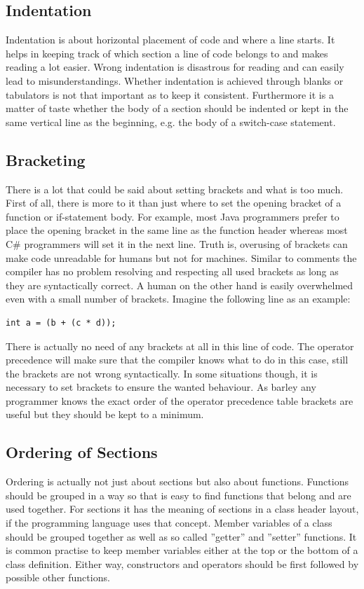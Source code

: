\subsection{Indentation}
Indentation is about horizontal placement of code and where a line starts. It helps in keeping track of which section a line of code belongs to and makes reading a lot easier. Wrong indentation is disastrous for reading and can easily lead to misunderstandings. Whether indentation is achieved through blanks or tabulators is not that important as to keep it consistent. Furthermore it is a matter of taste whether the body of a section should be indented or kept in the same vertical line as the beginning, e.g. the body of a switch-case statement.

\subsection{Bracketing}
There is a lot that could be said about setting brackets and what is too much. First of all, there is more to it than just where to set the opening bracket of a function or if-statement body. For example, most Java programmers prefer to place the opening bracket in the same line as the function header whereas most C\# programmers will set it in the next line.
Truth is, overusing of brackets can make code unreadable for humans but not for machines. Similar to comments the compiler has no problem resolving and respecting all used brackets as long as they are syntactically correct. A human on the other hand is easily overwhelmed even with a small number of brackets. Imagine the following line as an example:
\begin{lstlisting}[label={list:first}]
int a = (b + (c * d));
\end{lstlisting}
There is actually no need of any brackets at all in this line of code. The operator precedence will make sure that the compiler knows what to do in this case, still the brackets are not wrong syntactically. In some situations though, it is necessary to set brackets to ensure the wanted behaviour. As barley any programmer knows the exact order of the operator precedence table brackets are useful but they should be kept to a minimum.

\subsection{Ordering of Sections}
Ordering is actually not just about sections but also about functions. Functions should be grouped in a way so that is easy to find functions that belong and are used together. For sections it has the meaning of sections in a class header layout, if the programming language uses that concept. Member variables of a class should be grouped together as well as so called ''getter'' and ''setter'' functions. It is common practise to keep member variables either at the top or the bottom of a class definition. Either way, constructors and operators should be first followed by possible other functions.

